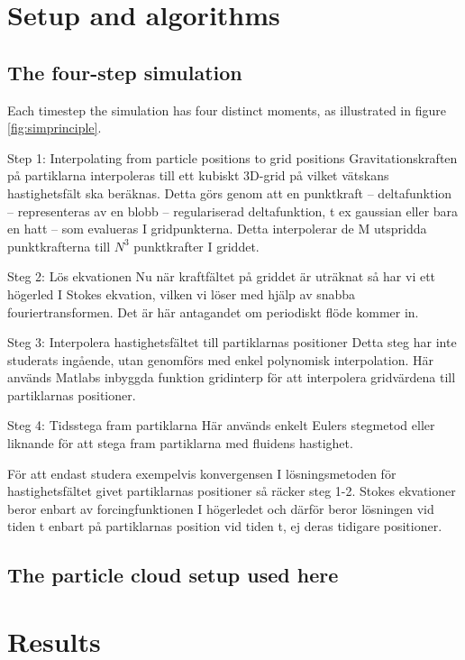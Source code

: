 \documentclass[a4paper,twoside=false,abstract=false,numbers=noenddot,
titlepage=false,headings=small,parskip=half,version=last]{scrartcl}
\begin{document}
\section{Setup and algorithms}
\subsection{The four-step simulation}

Each timestep the simulation has four distinct moments, as illustrated in figure \ref{fig:simprinciple}.

Step 1: Interpolating from particle positions to grid positions
Gravitationskraften på partiklarna interpoleras till ett kubiskt 3D-grid på vilket vätskans hastighetsfält ska beräknas. Detta görs genom att en punktkraft – deltafunktion – representeras av en	 blobb – regulariserad deltafunktion, t ex gaussian eller bara en hatt – som evalueras I gridpunkterna. Detta interpolerar de M utspridda punktkrafterna till $N^3$ punktkrafter I griddet.

Steg 2: Lös ekvationen
Nu när kraftfältet på griddet är uträknat så har vi ett högerled I Stokes ekvation, vilken vi löser med hjälp av snabba fouriertransformen. Det är här antagandet om periodiskt flöde kommer in.

Steg 3: Interpolera hastighetsfältet till partiklarnas positioner
Detta steg har inte studerats ingående, utan genomförs med enkel polynomisk interpolation. Här används Matlabs inbyggda funktion gridinterp för att interpolera gridvärdena till partiklarnas positioner.

Steg 4: Tidsstega fram partiklarna
Här används enkelt Eulers stegmetod eller liknande för att stega fram partiklarna med fluidens hastighet.

För att endast studera exempelvis konvergensen I lösningsmetoden för hastighetsfältet givet partiklarnas positioner så räcker steg 1-2. Stokes ekvationer beror enbart av forcingfunktionen I högerledet och därför beror lösningen vid tiden t enbart på partiklarnas position vid tiden t, ej deras tidigare positioner.

\subsection{The particle cloud setup used here}

\section{Results}
\end{document}
